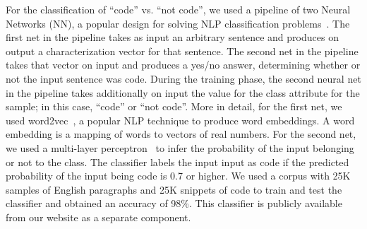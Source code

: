 \documentclass[smallextended]{svjour3}
\begin{document}
For the classification of ``code'' vs. ``not code'', we used a
pipeline of two Neural Networks (NN), a popular design for solving NLP
classification problems~\cite{kusner2015word}. The first net in the
pipeline takes as input an arbitrary sentence and produces on output a
characterization vector for that sentence. The second net in the
pipeline takes that vector on input and produces a yes/no answer,
determining whether or not the input sentence was code.  During the
training phase, the second neural net in the pipeline takes
additionally on input the value for the class attribute for the sample;
in this case, ``code'' or ``not code''. More in detail, for the first
net, we used word2vec~\cite{mikolov2013distributed}, a popular NLP
technique to produce word embeddings. A word embedding is a mapping of
words to vectors of real numbers. For the second net, we used a
multi-layer perceptron~\cite{Rumelhart:1986:LIR:104279.104293} to
infer the probability of the input belonging or not to the class. The
classifier labels the input input as code if the predicted probability
of the input being code is 0.7 or higher. We used a corpus with 25K
samples of English paragraphs and 25K snippets of \js{} code to train
and test the classifier and obtained an accuracy of 98\%. This
classifier is publicly available from our website as a separate
component.


\end{document}
